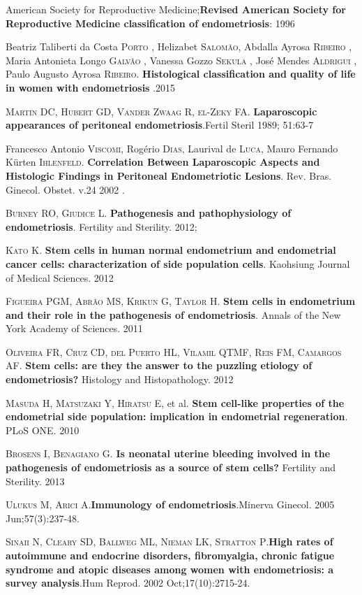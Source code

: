 \documentclass[12pt]{article} %
\begin{document}
American Society for Reproductive Medicine;\textbf{Revised American Society for Reproductive Medicine classification of endometriosis}: 1996

Beatriz Taliberti da Costa \textsc{Porto} , Helizabet \textsc{Salomão}, Abdalla Ayrosa \textsc{Ribeiro} , Maria Antonieta Longo \textsc{Galvão} , Vanessa Gozzo \textsc{Sekula} , José Mendes \textsc{Aldrigui} , Paulo Augusto Ayrosa \textsc{Ribeiro}.
\textbf{Histological classification and quality of life in women with endometriosis} .2015

\textsc{Martin DC, Hubert GD, Vander Zwaag R, el-Zeky FA}. \textbf{Laparoscopic appearances of peritoneal endometriosis}.Fertil Steril 1989; 51:63-7

Francesco Antonio \textsc{Viscomi}, Rogério \textsc{Dias}, Laurival de \textsc{Luca}, Mauro Fernando Kürten \textsc{Ihlenfeld}. \textbf{Correlation Between Laparoscopic Aspects and Histologic Findings in Peritoneal Endometriotic Lesions}. Rev. Bras. Ginecol. Obstet. v.24 2002 .

\textsc{Burney RO, Giudice L}.\textbf{ Pathogenesis and pathophysiology of endometriosis}. Fertility and Sterility. 2012;

\textsc{Kato K}. \textbf{Stem cells in human normal endometrium and endometrial cancer cells: characterization of side population cells}. Kaohsiung Journal of Medical Sciences. 2012

\textsc{Figueira PGM, Abrão MS, Krikun G, Taylor H}.\textbf{ Stem cells in endometrium and their role in the pathogenesis of endometriosis}. Annals of the New York Academy of Sciences. 2011

\textsc{Oliveira FR, Cruz CD, del Puerto HL, Vilamil QTMF, Reis FM, Camargos AF}.\textbf{ Stem cells: are they the answer to the puzzling etiology of endometriosis?} Histology and Histopathology. 2012

\textsc{Masuda H, Matsuzaki Y, Hiratsu E}, et al.\textbf{ Stem cell-like properties of the endometrial side population: implication in endometrial regeneration}. PLoS ONE. 2010

\textsc{Brosens I, Benagiano G}. \textbf{Is neonatal uterine bleeding involved in the pathogenesis of endometriosis as a source of stem cells?} Fertility and Sterility. 2013

\textsc{Ulukus M, Arici A}.\textbf{Immunology of endometriosis}.Minerva Ginecol. 2005 Jun;57(3):237-48.

\textsc{Sinaii N, Cleary SD, Ballweg ML, Nieman LK, Stratton P}.\textbf{High rates of autoimmune and endocrine disorders, fibromyalgia, chronic fatigue syndrome and atopic diseases among women with endometriosis: a survey analysis}.Hum Reprod. 2002 Oct;17(10):2715-24.
\end{document}
